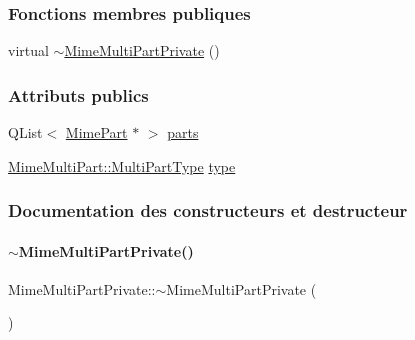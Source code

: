 \subsubsection*{Fonctions membres publiques}
\begin{DoxyCompactItemize}
\item 
virtual \hyperlink{class_simple_mail_1_1_mime_multi_part_private_a08989b9ed5f0787aaa1dceb753865004}{$\sim$\+Mime\+Multi\+Part\+Private} ()
\end{DoxyCompactItemize}
\subsubsection*{Attributs publics}
\begin{DoxyCompactItemize}
\item 
Q\+List$<$ \hyperlink{class_simple_mail_1_1_mime_part}{Mime\+Part} $\ast$ $>$ \hyperlink{class_simple_mail_1_1_mime_multi_part_private_a1b78f93d2ea55da1d40bf8c806e8ad59}{parts}
\item 
\hyperlink{class_simple_mail_1_1_mime_multi_part_a6bef6836f893f87c64c4ff0cb9a93e53}{Mime\+Multi\+Part\+::\+Multi\+Part\+Type} \hyperlink{class_simple_mail_1_1_mime_multi_part_private_ad4e1815d1d4113a61b591a243759d4c1}{type}
\end{DoxyCompactItemize}


\subsubsection{Documentation des constructeurs et destructeur}
\mbox{\label{class_simple_mail_1_1_mime_multi_part_private_a08989b9ed5f0787aaa1dceb753865004}} 
\paragraph{\texorpdfstring{$\sim$\+Mime\+Multi\+Part\+Private()}{~MimeMultiPartPrivate()}}
{\footnotesize\ttfamily Mime\+Multi\+Part\+Private\+::$\sim$\+Mime\+Multi\+Part\+Private (\begin{DoxyParamCaption}{ }\end{DoxyParamCaption})\hspace{0.3cm}{\ttfamily [virtual]}}



